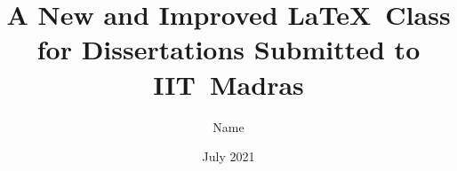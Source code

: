 
\title{A New and Improved \LaTeX\ Class for Dissertations Submitted to IIT~Madras}

\author{Name}

\date{July 2021}


\maketitle
\restoregeometry

\clearpage \mbox{} \thispagestyle{empty} \clearpage